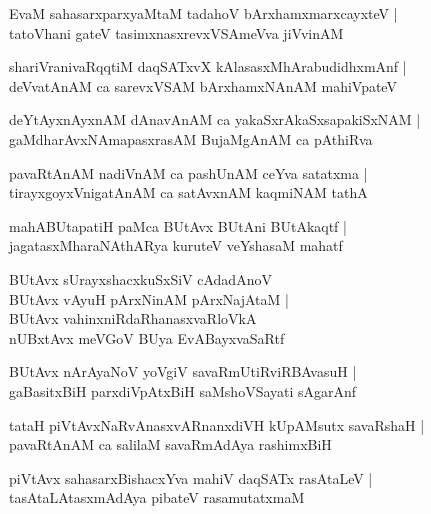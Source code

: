 \begin{shloka}
EvaM sahasarxparxyaMtaM tadahoV bArxhamxmarxcayxteV |\\
tatoVhani gateV tasimxnasxrevxVSAmeVva jiVvinAM 
\end{shloka}

\begin{shloka}
shariVranivaRqqtiM daqSATxvX kAlasasxMhArabudidhxmAnf |\\
deVvatAnAM ca sarevxVSAM bArxhamxNAnAM mahiVpateV 
\end{shloka}

\begin{shloka}
deYtAyxnAyxnAM dAnavAnAM ca yakaSxrAkaSxsapakiSxNAM |\\
gaMdharAvxNAmapasxrasAM BujaMgAnAM ca pAthiRva
\end{shloka}

\begin{shloka}
pavaRtAnAM nadiVnAM ca pashUnAM ceYva satatxma |\\
tirayxgoyxVnigatAnAM ca satAvxnAM kaqmiNAM tathA
\end{shloka}

\begin{shloka}
mahABUtapatiH paMca BUtAvx BUtAni BUtAkaqtf |\\
jagatasxMharaNAthARya kuruteV veYshasaM mahatf 
\end{shloka}

\begin{shloka}
BUtAvx sUrayxshacxkuSxSiV cAdadAnoV \\
BUtAvx vAyuH pArxNinAM pArxNajAtaM |\\
BUtAvx vahinxniRdaRhanasxvaRloVkA \\
nUBxtAvx meVGoV BUya EvABayxvaSaRtf 
\end{shloka}

\begin{shloka}
BUtAvx nArAyaNoV yoVgiV savaRmUtiRviRBAvasuH |\\
gaBasitxBiH parxdiVpAtxBiH saMshoVSayati sAgarAnf
\end{shloka}

\begin{shloka}
tataH piVtAvxNaRvAnasxvARnanxdiVH kUpAMsutx savaRshaH |\\
pavaRtAnAM ca salilaM savaRmAdAya rashimxBiH 
\end{shloka}

\begin{shloka}
piVtAvx sahasarxBishacxYva mahiV daqSATx rasAtaLeV |\\
tasAtaLAtasxmAdAya pibateV rasamutatxmaM 
\end{shloka}


